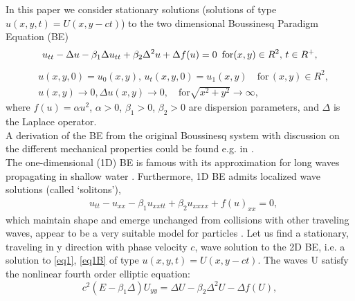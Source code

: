 \documentclass[12pt]{article}
\theoremstyle{theorem}
\theoremstyle{defi}
\begin{document}
In this paper we consider stationary solutions (solutions of type  $u(x,y,t)=U(x,y - ct)$) to the two dimensional Boussinesq Paradigm Equation (BE) 
\begin{equation}
u_{tt} - \Delta u -\beta_1  \Delta u_{tt} +\beta_2 \Delta ^2 u + \Delta f(u)=0 \enskip \text{for} (x,y) \in R^2, \, t\in R^+ ,\label{eq1}
\end{equation}
\begin{equation}\label{eq1B}
\begin{split}
&u(x,y,0)=u_0(x,y), \, u_t(x,y,0)=u_1(x,y)   \quad\text{for} \, (x,y) \in R^2, \\
&u(x,y) \rightarrow 0,  \Delta u(x,y) \rightarrow 0 ,  \quad \text{for}  \sqrt{x^2 + y^2} \rightarrow \infty, 
\end{split}
\end{equation}
where   $f(u)=\alpha u^2$,  $\alpha>0$, $\beta_1>0$, $\beta_2>0$  are dispersion parameters, and $\Delta$ is the Laplace operator. 
\\
A derivation of the BE from the original Boussinesq system with discussion on the different mechanical properties could be found e.g. in \cite{ref1}. 
\\
The one-dimensional (1D) BE is famous with its approximation for long waves propagating in shallow water \cite{ref2, ref3}. Furthermore, 1D BE admits localized wave solutions (called ‘solitons’), 
\begin{align}
&u_{tt} - u_{xx} -\beta_1  u_{xxtt} +\beta_2 u_{xxxx} + f(u)_{xx} =0, \label{eq2}
\end{align}
which maintain shape and emerge unchanged from collisions with other traveling waves, appear to be a very suitable model for particles \cite{ref4, ref5}.
Let us find a stationary, traveling in y direction with phase velocity $c$, wave solution to the 2D BE, i.e. a solution to \eqref{eq1}, \eqref{eq1B} of type $u(x,y,t)=U(x,y - ct)$. The waves U satisfy the nonlinear fourth order elliptic equation:
\begin{equation}
c^2 (E-\beta_1 \Delta) U_{yy} = \Delta U -\beta_2 \Delta^2 U - \Delta f(U), \label{eq3}
\end{equation}
\end{document}

